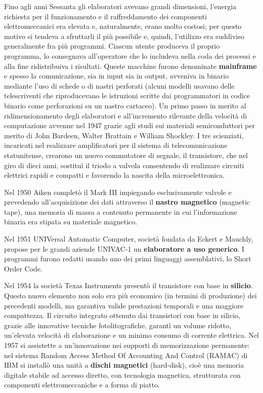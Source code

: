 \documentclass[12pt]{article}
\begin{document}
Fino agli anni Sessanta gli elaboratori avevano grandi dimensioni, l’energia richiesta per il funzionamento e il raffreddamento dei componenti elettromeccanici era elevata e, naturalmente, erano molto costosi; per questo motivo si tendeva a sfruttarli il più possibile e, quindi, l’utilizzo era suddiviso generalmente fra più programmi. Ciascun utente produceva il proprio programma, lo consegnava all’operatore che lo includeva nella coda dei processi e alla fine ridistribuiva i risultati. Queste macchine furono denominate \textbf{mainframe} e spesso la comunicazione, sia in input sia in output, avveniva in binario mediante l’uso di schede o di nastri perforati (alcuni modelli usavano delle telescriventi che riproducevano le istruzioni scritte dai programmatori in codice binario come perforazioni su un nastro cartaceo). Un primo passo in merito al ridimensionamento degli elaboratori e all’incremento rilevante della velocità di computazione avvenne nel 1947 grazie agli studi sui materiali semiconduttori per merito di John Bardeen, Walter Brattain e William Shockley. I tre scienziati, incaricati nel realizzare amplificatori per il sistema di telecomunicazione statunitense, crearono un nuovo commutatore di segnale, il transistore, che nel giro di dieci anni, sostituì il triodo a valvola consentendo di realizzare circuiti elettrici rapidi e compatti e favorendo la nascita della microelettronica.\par\medskip\noindent
Nel 1950 Aiken completò il Mark III impiegando esclusivamente valvole e prevedendo all’acquisizione dei dati attraverso il \textbf{nastro magnetico} (magnetic tape), una memoria di massa a contenuto permanente in cui l’informazione binaria era stipata su materiale magnetico.\par\medskip\noindent
Nel 1951 UNIVersal Automatic Computer, società fondata da Eckert e Mauchly, propose per le grandi aziende UNIVAC-1 un \textbf{elaboratore a uso generico}. I programmi furono redatti usando uno dei primi linguaggi assemblativi, lo Short Order Code.\par\medskip\noindent
Nel 1954 la società Texas Instruments presentò il transistore con base in \textbf{silicio}. Questo nuovo elemento non solo era più economico (in termini di produzione) dei precedenti modelli, ma garantiva valide prestazioni temporali e una maggiore compattezza. Il circuito integrato ottenuto dai transistori con base in silicio, grazie alle innovative tecniche fotolitografiche, garantì un volume ridotto, un’elevata velocità di elaborazione e un minimo consumo di corrente elettrica. Nel 1957 si assistette a un’innovazione nei supporti di memorizzazione permanente: nel sistema Random Access Method Of Accounting And Control (RAMAC) di IBM si installò una unità a \textbf{dischi magnetici} (hard-disk), cioè una memoria digitale stabile ad accesso diretto, con tecnologia magnetica, strutturata con componenti elettromeccaniche e a forma di piatto. \par\medskip\noindent 
\end{document}
